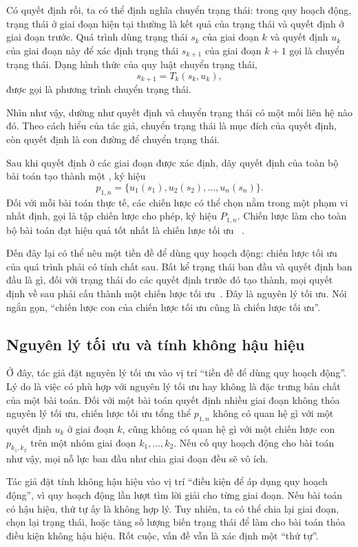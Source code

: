 \documentclass[11pt]{article}
\begin{document}
Có quyết định rồi, ta có thể định nghĩa chuyển trạng thái: trong quy hoạch
động, trạng thái ở giai đoạn hiện tại thường là kết quả của trạng thái và
quyết định ở giai đoạn trước. Quá trình dùng trạng thái \(s_k\) của giai
đoạn \(k\) và quyết định \(u_k\) của giai đoạn này để xác định trạng thái
\(s_{k+1}\) của giai đoạn \(k+1\) gọi là chuyển trạng thái. Dạng hình thức
của quy luật chuyển trạng thái,
\[
  s_{k+1}=T_k(s_k,u_k),
\]
được gọi là phương trình chuyển trạng thái.

Nhìn như vậy, dường như quyết định và chuyển trạng thái có một mối liên hệ
nào đó. Theo cách hiểu của tác giả, chuyển trạng thái là mục đích của quyết
định, còn quyết định là con đường để chuyển trạng thái.

Sau khi quyết định ở các giai đoạn được xác định, dãy quyết định của toàn bộ
bài toán tạo thành một , ký hiệu
\[
  p_{1,n}=\{u_1(s_1),u_2(s_2),\ldots,u_n(s_n)\}.
\]
Đối với mỗi bài toán thực tế, các chiến lược có thể chọn nằm trong một phạm
vi nhất định, gọi là tập chiến lược cho phép, ký hiệu \(P_{1,n}\). Chiến lược
làm cho toàn bộ bài toán đạt hiệu quả tốt nhất là chiến lược tối ưu
~\cite{operations}.

Đến đây lại có thể nêu một tiền đề để dùng quy hoạch động: chiến lược tối ưu
của quá trình phải có tính chất sau. Bất kể trạng thái ban đầu và quyết định
ban đầu là gì, đối với trạng thái do các quyết định trước đó tạo thành, mọi
quyết định về sau phải cấu thành một chiến lược tối ưu~\cite{operations}.
Đây là nguyên lý tối ưu. Nói ngắn gọn, ``chiến lược con của chiến lược tối ưu
cũng là chiến lược tối ưu''.

\subsection{Nguyên lý tối ưu và tính không hậu hiệu}

Ở đây, tác giả đặt nguyên lý tối ưu vào vị trí ``tiền đề để dùng quy hoạch
động''. Lý do là việc có phù hợp với nguyên lý tối ưu hay không là đặc trưng
bản chất của một bài toán. Đối với một bài toán quyết định nhiều giai đoạn
không thỏa nguyên lý tối ưu, chiến lược tối ưu tổng thể \(p_{1,n}\) không có
quan hệ gì với một quyết định \(u_k\) ở giai đoạn \(k\), cũng không có quan
hệ gì với một chiến lược con \(p_{k_1,k_2}\) trên một nhóm giai đoạn
\(k_1,\ldots,k_2\). Nếu cố quy hoạch động cho bài toán như vậy, mọi nỗ lực
ban đầu như chia giai đoạn đều sẽ vô ích.

Tác giả đặt tính không hậu hiệu vào vị trí ``điều kiện để áp dụng quy hoạch
động'', vì quy hoạch động lần lượt tìm lời giải cho từng giai đoạn. Nếu bài
toán có hậu hiệu, thứ tự ấy là không hợp lý. Tuy nhiên, ta có thể chia lại
giai đoạn, chọn lại trạng thái, hoặc tăng số lượng biến trạng thái để làm cho
bài toán thỏa điều kiện không hậu hiệu. Rốt cuộc, vấn đề vẫn là xác định một
``thứ tự''.
\end{document}
